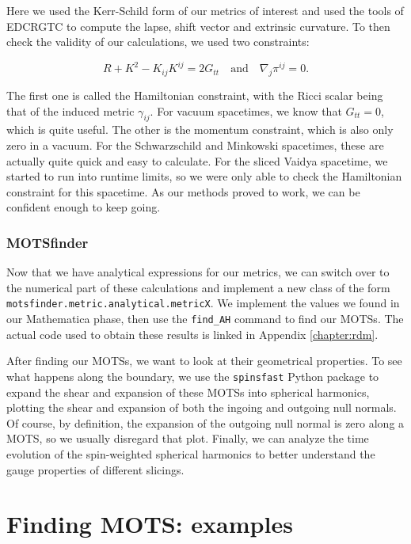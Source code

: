 \documentclass[twoside, openright]{RadboudReport}
\begin{document}
Here we used the Kerr-Schild form of our metrics of interest and used the tools of EDCRGTC to compute the lapse, shift vector and extrinsic curvature. To then check the validity of our calculations, we used two constraints:

\begin{equation}
	R + K^2 - K_{ij}K^{ij} = 2G_{tt} \quad \text{and} \quad \nabla_j \pi^{ij} = 0.
\end{equation}

The first one is called the Hamiltonian constraint, with the Ricci scalar being that of the induced metric $\gamma_{ij}$. For vacuum spacetimes, we know that $G_{tt}=0$, which is quite useful. The other is the momentum constraint, which is also only zero in a vacuum. For the Schwarzschild and Minkowski spacetimes, these are actually quite quick and easy to calculate. For the sliced Vaidya spacetime, we started to run into runtime limits, so we were only able to check the Hamiltonian constraint for this spacetime. As our methods proved to work, we can be confident enough to keep going.

\subsection{MOTSfinder}

Now that we have analytical expressions for our metrics, we can switch over to the numerical part of these calculations and implement a new class of the form \verb*|motsfinder.metric.analytical.metricX|. We implement the values we found in our Mathematica phase, then use the \verb*|find_AH| command to find our MOTSs. The actual code used to obtain these results is linked in Appendix \ref{chapter:rdm}.\newline

After finding our MOTSs, we want to look at their geometrical properties. To see what happens along the boundary, we use the \verb*|spinsfast| Python package to expand the shear and expansion of these MOTSs into spherical harmonics, plotting the shear and expansion of both the ingoing and outgoing null normals. Of course, by definition, the expansion of the outgoing null normal is zero along a MOTS, so we usually disregard that plot. Finally, we can analyze the time evolution of the spin-weighted spherical harmonics to better understand the gauge properties of different slicings.

\chapter{Finding MOTS: examples}
\end{document}
